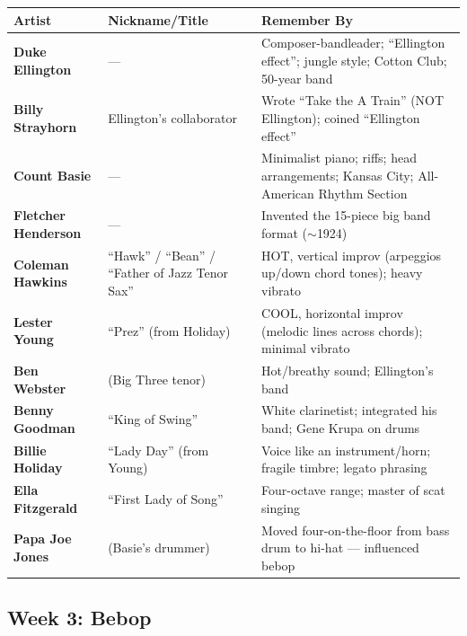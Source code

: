 \documentclass[11pt,letterpaper]{article}
\begin{document}
\begin{small}
\begin{tabularx}{\textwidth}{>{\bfseries}p{3cm} p{3.2cm} X}
\toprule
\textbf{Artist} & \textbf{Nickname/Title} & \textbf{Remember By} \\
\midrule
Duke Ellington & --- & Composer-bandleader; ``Ellington effect''; jungle style; Cotton Club; 50-year band \\
Billy Strayhorn & Ellington's collaborator & Wrote ``Take the A Train'' (NOT Ellington); coined ``Ellington effect'' \\
Count Basie & --- & Minimalist piano; riffs; head arrangements; Kansas City; All-American Rhythm Section \\
Fletcher Henderson & --- & Invented the 15-piece big band format ($\sim$1924) \\
Coleman Hawkins & ``Hawk'' / ``Bean'' / ``Father of Jazz Tenor Sax'' & HOT, vertical improv (arpeggios up/down chord tones); heavy vibrato \\
Lester Young & ``Prez'' (from Holiday) & COOL, horizontal improv (melodic lines across chords); minimal vibrato \\
Ben Webster & (Big Three tenor) & Hot/breathy sound; Ellington's band \\
Benny Goodman & ``King of Swing'' & White clarinetist; integrated his band; Gene Krupa on drums \\
Billie Holiday & ``Lady Day'' (from Young) & Voice like an instrument/horn; fragile timbre; legato phrasing \\
Ella Fitzgerald & ``First Lady of Song'' & Four-octave range; master of scat singing \\
Papa Joe Jones & (Basie's drummer) & Moved four-on-the-floor from bass drum to hi-hat --- influenced bebop \\
\bottomrule
\end{tabularx}
\end{small}

\subsection{\textcolor{week3color}{Week 3: Bebop}}
\end{document}
